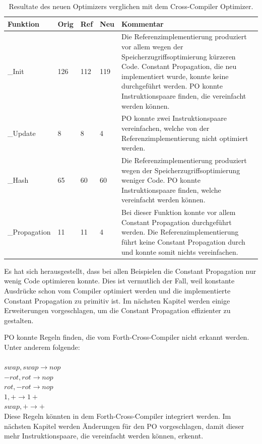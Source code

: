 \begin{table}[H]
\begin{center}
    \begin{tabular}{ | l | l | l | l | p{8cm} |}
    \hline
    \textbf{Funktion} & \textbf{Orig} & \textbf{Ref} & \textbf{Neu} & \textbf{Kommentar} \\ \hline
    \_Init & 126 & 112 & 119 & Die Referenzimplementierung produziert vor allem wegen der Speicherzugriffsoptimierung kürzeren Code. Constant Propagation, die neu implementiert wurde, konnte keine durchgeführt werden. PO konnte Instruktionspaare finden, die vereinfacht werden können.  \\ \hline
		\_Update & 8 & 8 & 4 & PO konnte zwei Instruktionspaare vereinfachen, welche von der Referenzimplementierung nicht optimiert werden. \\ \hline
		\_Hash & 65 & 60 & 60 & Die Referenzimplementierung produziert wegen der Speicherzugriffsoptimierung weniger Code. PO konnte Instruktionspaare finden, welche vereinfacht werden können. \\ \hline
		\_Propagation & 11 & 11 & 4 & Bei dieser Funktion konnte vor allem Constant Propagation durchgeführt werden. Die Referenzimplementierung führt keine Constant Propagation durch und konnte somit nichts vereinfachen. \\ \hline
    \end{tabular}
		\caption{Resultate des neuen Optimizers verglichen mit dem Cross-Compiler Optimizer.}
		\label{tab:peepresults}
\end{center}
\end{table}
\newpage

Es hat sich herausgestellt, dass bei allen Beispielen die Constant Propagation nur wenig Code optimieren konnte. Dies ist vermutlich der Fall, weil konstante Ausdrücke schon vom Compiler optimiert werden und die implementierte Constant Propagation zu primitiv ist. Im nächsten Kapitel werden einige Erweiterungen vorgeschlagen, um die Constant Propagation effizienter zu gestalten.  

PO konnte Regeln finden, die vom Forth-Cross-Compiler nicht erkannt werden. Unter anderem folgende:\\ \\
%
$swap, swap \rightarrow nop$\\
$-rot, rot \rightarrow nop$\\
$rot, -rot \rightarrow nop$\\
$1, + \rightarrow 1+$\\
$swap, + \rightarrow +$\\
%
Diese Regeln könnten in dem Forth-Cross-Compiler integriert werden. Im nächsten Kapitel werden Änderungen für den PO vorgeschlagen, damit dieser mehr Instruktionspaare, die vereinfacht werden können, erkennt.

